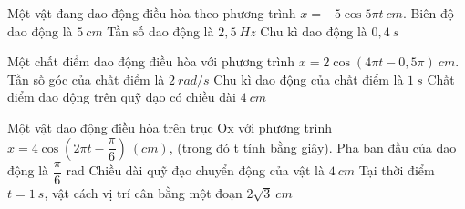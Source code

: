 \setcounter{ex}{0}
\PhanII
\begin{ex}
Một vật đang dao động điều hòa theo phương trình $x=-5 \cos 5 \pi t\ cm$.
{\True Biên độ dao động là $5 \ cm$}
{\True Tần số dao động là $2,5 \ Hz$}
{\True Chu kì dao động là $0,4 \ s$}
\loigiai{
\begin{itemchoice}
\itemch
\itemch
\itemch
\itemch
\end{itemchoice}
}
\end{ex} 
\begin{ex}
Một chất điểm dao động điều hòa với phương trình $x=2 \cos (4 \pi t-0,5 \pi)\ cm$.
{Tần số góc của chất điểm là $2\ rad/s$}
{Chu kì dao động của chất điểm là $1 \ s$}
{\True Chất điểm dao động trên quỹ đạo có chiều dài $4 \ cm$}
\loigiai{
\begin{itemchoice}
\itemch
\itemch
\itemch
\itemch
\end{itemchoice}
}
\end{ex} 
\begin{ex}
Một vật dao động điều hòa trên trục Ox với phương trình $x=4 \cos \left(2 \pi t-\dfrac{\pi}{6}\right)\ (cm)$, (trong đó t tính bằng giây).
{Pha ban đầu của dao động là $\dfrac{\pi}{6}$ rad}
{Chiều dài quỹ đạo chuyển động của vật là $4\ cm$}
{\True Tại thời điểm $t=1 \ s$, vật cách vị trí cân bằng một đoạn $2 \sqrt{3} \ cm$}
\end{ex}
